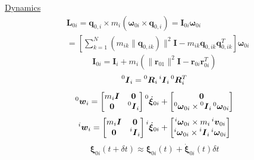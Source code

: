\documentclass[twocolumn]{article}    %
\begin{document}
\newpage
\noindent\underline{Dynamics}
\begin{align*}
    &\bm{L}_{0i} = \bm{q}_{0,i} \times m_i(\bm{\omega}_{0i} \times \bm{q}_{0,i}) = \bm{I}_{0i} \bm{\omega}_{0i}\\
    &= \left[\sum_{k=1}^N(m_{ik}\|\bm{q}_{0,ik})\|^2\bm{I} - m_{ik}\bm{q}_{0,ik}\bm{q}_{0,ik}^T\right]\bm{\omega}_{0i}
\end{align*}
\begin{equation*}
    \bm{I}_{0i} = \bm{I}_i + m_i(\|\bm{r}_{01}\|^2\bm{I} - \bm{r}_{0i}\bm{r}_{0i}^T)
\end{equation*}
\begin{equation*}
    \prescript{0}{}{\bm{I}}_i = \prescript{0}{}{\bm{R}}_i \prescript{i}{}{\bm{I}}_{i} \prescript{0}{}{\bm{R}}_i^T
\end{equation*}
\begin{equation*}
    \prescript{0}{}{\bm{w}}_i = \begin{bmatrix}
        m_i\bm{I} & \bm{0} \\ \bm{0} & \prescript{0}{}{\bm{I}}_i
    \end{bmatrix} \prescript{0}{}{\dot{\bm{\xi}}}_{0i} + \begin{bmatrix}
        \bm{0} \\ \prescript{0}{}{\bm{\omega}}_{0i} \times \prescript{0}{}{\bm{I}}_i \prescript{0}{}{\bm{\omega}}_{0i}
    \end{bmatrix}
\end{equation*}
\begin{equation*}
    \prescript{i}{}{\bm{w}}_i = \begin{bmatrix}
        m_i\bm{I} & \bm{0} \\ \bm{0} & \prescript{i}{}{\bm{I}}_i
    \end{bmatrix} \prescript{i}{}{\dot{\bm{\xi}}}_{0i} + \begin{bmatrix}
        \prescript{i}{}{\bm{\omega}}_{0i} \times m_i \prescript{i}{}{\bm{v}}_{0i} \\ 
        \prescript{i}{}{\bm{\omega}}_{0i} \times \prescript{i}{}{\bm{I}}_i \prescript{i}{}{\bm{\omega}}_{0i}
    \end{bmatrix}
\end{equation*}
\begin{equation*}
    \bm{\xi}_{0i}(t+\delta t) \approx \bm{\xi}_{0i}(t) + \dot{\bm{\xi}}_{0i}(t) \delta t
\end{equation*}
\end{document}
